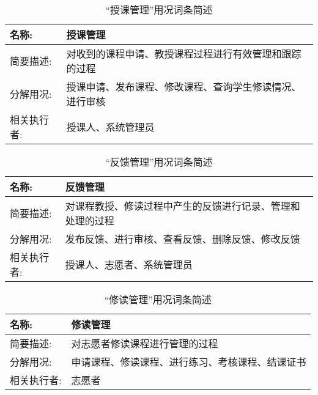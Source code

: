 \begin{table}[H]  
\caption{“授课管理”用况词条简述}  
\begin{center}  
    \begin{tabular}{l p{11cm}} 
        \hline
        \quad 名称:  & 授课管理 \\
        \hline
        \quad 简要描述:  & 对收到的课程申请、教授课程过程进行有效管理和跟踪的过程 \\
        \hline
        \quad 分解用况:  & 授课申请、发布课程、修改课程、查询学生修读情况、进行审核 \\
        \hline
        \quad 相关执行者:  & 授课人、系统管理员 \\
        \hline
    \end{tabular}
    \label{tab1}
\end{center}
\end{table}

\begin{table}[H]  
\caption{“反馈管理”用况词条简述}  
\begin{center}  
    \begin{tabular}{l p{11cm}} 
        \hline
        \quad 名称:  & 反馈管理 \\
        \hline
        \quad 简要描述:  & 对课程教授、修读过程中产生的反馈进行记录、管理和处理的过程 \\
        \hline
        \quad 分解用况:  & 发布反馈、进行审核、查看反馈、删除反馈、修改反馈 \\
        \hline
        \quad 相关执行者:  & 授课人、志愿者、系统管理员 \\
        \hline
    \end{tabular}
    \label{tab1}
\end{center}
\end{table}

\begin{table}[H]  
\caption{“修读管理”用况词条简述}  
\begin{center}  
    \begin{tabular}{l p{11cm}} 
        \hline
        \quad 名称:  & 修读管理 \\
        \hline
        \quad 简要描述:  & 对志愿者修读课程进行管理的过程 \\
        \hline
        \quad 分解用况:  & 申请课程、修读课程、进行练习、考核课程、结课证书 \\
        \hline
        \quad 相关执行者:  & 志愿者 \\
        \hline
    \end{tabular}
    \label{tab1}
\end{center}
\end{table}
